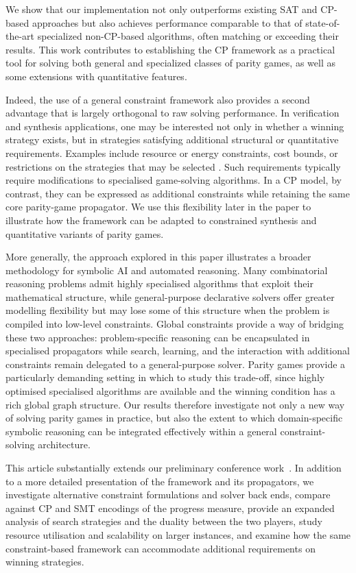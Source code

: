 \documentclass[a4paper,fleqn]{cas-sc}
\begin{document}
We show that our implementation not only outperforms existing SAT and CP-based approaches but also achieves performance comparable to that of state-of-the-art specialized non-CP-based algorithms, often matching or exceeding their results. This work contributes to establishing the CP framework as a practical tool for solving both general and specialized classes of parity games, as well as some extensions with quantitative features. 

Indeed, the use of a general constraint framework also provides a second advantage
that is largely orthogonal to raw solving performance. In verification and
synthesis applications, one may be interested not only in whether a winning
strategy exists, but in strategies satisfying additional structural or
quantitative requirements. Examples include resource or energy constraints,
cost bounds, or restrictions on the strategies that may be selected
\citep{ChatterjeeD12,Fijalkow:2014,Weinert:2016}. Such requirements typically
require modifications to specialised game-solving algorithms. In a CP model,
by contrast, they can be expressed as additional constraints while retaining
the same core parity-game propagator. We use this flexibility later in the
paper to illustrate how the framework can be adapted to constrained synthesis
and quantitative variants of parity games.

More generally, the approach explored in this paper illustrates a broader
methodology for symbolic AI and automated reasoning. Many combinatorial
reasoning problems admit highly specialised algorithms that exploit their
mathematical structure, while general-purpose declarative solvers offer
greater modelling flexibility but may lose some of this structure when the
problem is compiled into low-level constraints. Global constraints provide
a way of bridging these two approaches: problem-specific reasoning can be
encapsulated in specialised propagators while search, learning, and the
interaction with additional constraints remain delegated to a general-purpose
solver. Parity games provide a particularly demanding setting in which to
study this trade-off, since highly optimised specialised algorithms are
available and the winning condition has a rich global graph structure. Our
results therefore investigate not only a new way of solving parity games in practice,
but also the extent to which domain-specific symbolic reasoning can be
integrated effectively within a general constraint-solving architecture.

This article substantially extends our preliminary conference
work~\citep{Hernandez:2026:noc}. In addition to a more detailed presentation
of the \noc framework and its propagators, we investigate alternative
constraint formulations and solver back ends, compare against CP and SMT
encodings of the progress measure, provide an expanded analysis
of search strategies and the duality between the two players, study resource
utilisation and scalability on larger instances, and examine how the same
constraint-based framework can accommodate additional requirements on
winning strategies.
\end{document}
